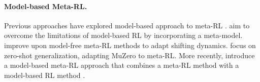 \documentclass{article}
\begin{document}
\paragraph*{Model-based Meta-RL.}
Previous approaches have explored model-based approach to meta-RL \citep{GP, AdMRL, M3PO, densityEst}.
\citet{MB-MPO} aim to overcome the limitations of model-based RL \citep{MBPO} by incorporating a meta-model.
\citet{ReBAL} improve upon model-free meta-RL methods \citep{RL2, MAML} to adapt shifting dynamics.
\citet{ProcGenMuZero} focus on zero-shot generalization, adapting MuZero \citep{MuZero} to meta-RL.
More recently, \citet{MAMBA} introduce a model-based meta-RL approach that combines a meta-RL method \citep{VariBAD} with a model-based RL method \citep{DreamerV3}.
\end{document}
